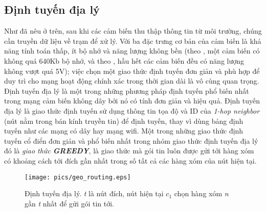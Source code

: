 \documentclass[12pt]{report}
\begin{document}
\subsection{Định tuyến địa lý}
\label{sec:1.2.1}
Như đã nêu ở trên, sau khi các cảm biến thu thập thông tin từ môi trường, chúng cần truyền dữ liệu về trạm để xử lý. Với ba đặc trưng cơ bản của cảm biến là khả năng tính toán thấp, ít bộ nhớ và năng lượng không bền (theo \cite{agri1}, một cảm biến có không quá 640Kb bộ nhớ, và theo \cite{agri1, sensorenergy}, hầu hết các cảm biến đều có năng lượng không vượt quá 5V); việc chọn một giao thức định tuyến đơn giản và phù hợp để duy trì cho mạng hoạt động chính xác trong thời gian dài là vô cùng quan trọng.\\
Định tuyến địa lý là một trong những phương pháp định tuyến phổ biến nhất trong mạng cảm biến không dây bởi nó có tính đơn giản và hiệu quả. Định tuyến địa lý là giao thức định tuyến sử dụng thông tin tọa độ và ID của \textit{1-hop neighbor} (nút nằm trong bán kính truyền tin) để định tuyến, thay vì dùng bảng định tuyến như các mạng có dây hay mạng wifi. Một trong những giao thức định tuyến cổ điển đơn giản và phổ biến nhất trong nhóm giao thức định tuyến địa lý đó là \textit{giao thức \textbf{GREEDY}}, là giao thức mà gói tin luôn được gửi tới hàng xóm có khoảng cách tới đích gần nhất trong số tất cả các hàng xóm của nút hiện tại.
\begin{figure}[H]
\centering
\texttt{[image: pics/geo\_routing.eps]}
\caption[Định tuyến địa lý]{Định tuyến địa lý. \textit{t} là nút đích, nút hiện tại $c_{1}$ chọn hàng xóm \textit{n} gần \textit{t} nhất để gửi gói tin tới.}
\end{figure}
\end{document}
